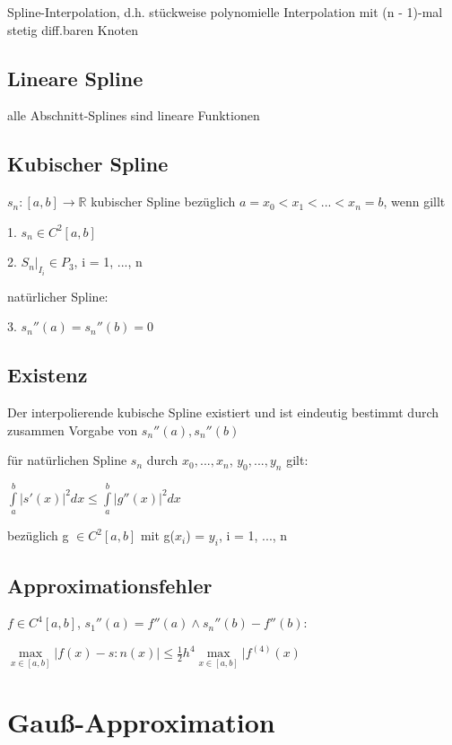 \documentclass[12pt,a4paper]{article} %
\newcommand*\tab[1][1cm]{\hspace*{#1}}
\begin{document}
	Spline-Interpolation, d.h. stückweise polynomielle Interpolation mit (n - 1)-mal stetig diff.baren Knoten
	
	\subsection{Lineare Spline}
	
	alle Abschnitt-Splines sind lineare Funktionen
	
	\subsection{Kubischer Spline}
	
	$s_n: [a, b] \rightarrow \mathbb{R}$ kubischer Spline bezüglich $a = x_0 < x_1 < ... < x_n = b$, wenn gillt
	
	1. $s_n \in C^2[a, b]$
	
	2. $S_n|_{I_i} \in P_3$, i = 1, ..., n
	
	natürlicher Spline:
	
	3. $s_n''(a) = s_n''(b) = 0$
	
	\subsection{Existenz}
	
	Der interpolierende kubische Spline existiert und ist eindeutig bestimmt durch zusammen Vorgabe von $s_n''(a), s_n''(b)$
	
	für natürlichen Spline $s_n$ durch $x_0, ..., x_n$, $y_0, ..., y_n$ gilt:
	
	\tab $\int\limits_{a}^{b}|s'(x)|^2dx \le \int\limits_{a}^{b}|g''(x)|^2dx$
	
	bezüglich g $\in C^2[a, b]$ mit g($x_i$) = $y_i$, i = 1, ..., n
	
	\subsection{Approximationsfehler}
	
	$f \in C^4[a, b]$, $s_1''(a) = f''(a) \wedge s_n''(b) - f''(b)$:
	
	$\max\limits_{x \in [a, b]}|f(x) - s:n(x)| \le \frac{1}{2}h^4 \max\limits_{x \in [a, b]}|f^{(4)}(x)$
	
	\newpage
	
	\section{Gauß-Approximation}
	
\end{document}
